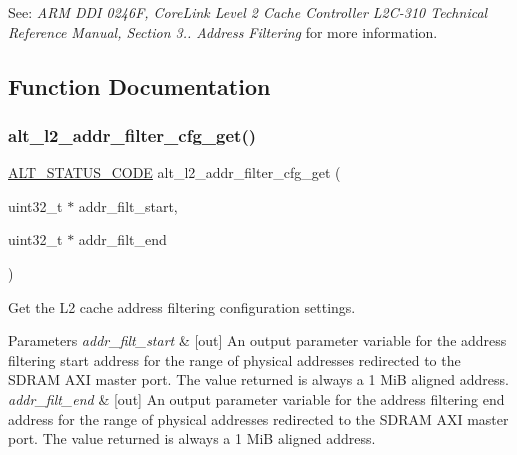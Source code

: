 See\+: {\itshape A\+RM D\+DI 0246F, Core\+Link Level 2 Cache Controller L2\+C-\/310 Technical Reference Manual, Section 3.. Address Filtering } for more information. 

\subsection{Function Documentation}
\mbox{\label{group__L2__ADDR__FLTR_gac72535f2c4ed0dce395ef787a8ab47da}} 
\subsubsection{\texorpdfstring{alt\_l2\_addr\_filter\_cfg\_get()}{alt\_l2\_addr\_filter\_cfg\_get()}}
{\footnotesize\ttfamily \mbox{\hyperlink{hwlib_8h_abdb0d369f069723ca55d6c94bcaaaa12}{A\+L\+T\+\_\+\+S\+T\+A\+T\+U\+S\+\_\+\+C\+O\+DE}} alt\+\_\+l2\+\_\+addr\+\_\+filter\+\_\+cfg\+\_\+get (\begin{DoxyParamCaption}\item[{uint32\+\_\+t $\ast$}]{addr\+\_\+filt\+\_\+start,  }\item[{uint32\+\_\+t $\ast$}]{addr\+\_\+filt\+\_\+end }\end{DoxyParamCaption})}

Get the L2 cache address filtering configuration settings.


\begin{DoxyParams}{Parameters}
{\em addr\+\_\+filt\+\_\+start} & \mbox{[}out\mbox{]} An output parameter variable for the address filtering start address for the range of physical addresses redirected to the S\+D\+R\+AM A\+XI master port. The value returned is always a 1 MiB aligned address.\\
\hline
{\em addr\+\_\+filt\+\_\+end} & \mbox{[}out\mbox{]} An output parameter variable for the address filtering end address for the range of physical addresses redirected to the S\+D\+R\+AM A\+XI master port. The value returned is always a 1 MiB aligned address.\\
\hline
\end{DoxyParams}

